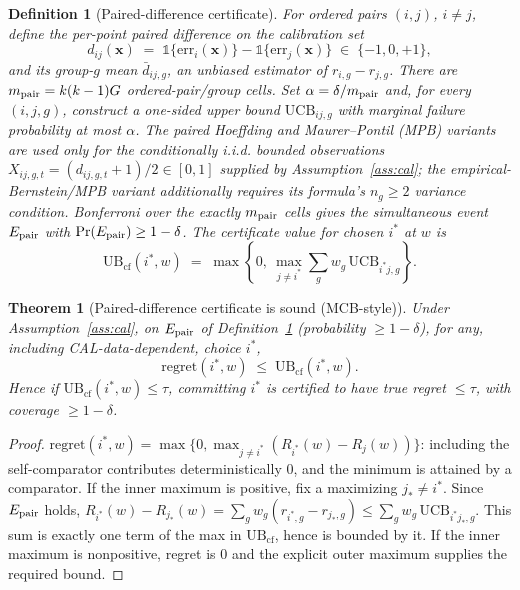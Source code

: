 \documentclass{article}
\newtheorem{theorem}{Theorem}
\newtheorem{definition}{Definition}
\begin{document}
\begin{definition}[Paired-difference certificate]
\label{def:paired}
For ordered pairs $(i,j)$, $i\ne j$, define the per-point paired difference on the
calibration set
\[
  d_{ij}(\mathbf{x}) \;=\; \mathbb{1}\{\text{err}_i(\mathbf{x})\}
        - \mathbb{1}\{\text{err}_j(\mathbf{x})\} \;\in\; \{-1,0,+1\},
\]
and its group-$g$ mean $\bar d_{ij,g}$, an unbiased estimator of $r_{i,g}-r_{j,g}$.
There are $m_{\rm pair}=k(k-1)G$ ordered-pair/group cells. Set
$\alpha=\delta/m_{\rm pair}$ and, for every $(i,j,g)$, construct a one-sided upper bound
$\mathrm{UCB}_{ij,g}$ with marginal failure probability at most $\alpha$. The paired
Hoeffding and Maurer--Pontil (MPB) variants are used only for the conditionally i.i.d. bounded
observations $X_{ij,g,t}=(d_{ij,g,t}+1)/2\in[0,1]$ supplied by
Assumption~\ref{ass:cal}; the empirical-Bernstein/MPB variant additionally requires its
formula's $n_g\ge2$ variance condition. Bonferroni over the exactly $m_{\rm pair}$ cells gives
the simultaneous event $E_{\rm pair}$ with $\Pr(E_{\rm pair})\ge1-\delta$. The certificate
value for chosen $i^*$ at $w$ is
\[
  \mathrm{UB}_{\mathrm{cf}}(i^*,w) \;=\;
  \max\!\left\{0,\ \max_{j\ne i^*}\sum_{g} w_g\, \mathrm{UCB}_{i^*j,g}\right\}.
\]
\end{definition}

\begin{theorem}[Paired-difference certificate is sound (MCB-style)]
\label{thm:m25}
Under Assumption~\ref{ass:cal}, on $E_{\rm pair}$ of Definition~\ref{def:paired}
(probability $\ge1-\delta$), for \emph{any}, including CAL-data-dependent, choice $i^*$,
\[
  \mathrm{regret}(i^*,w)\;\le\;\mathrm{UB}_{\mathrm{cf}}(i^*,w).
\]
Hence if $\mathrm{UB}_{\mathrm{cf}}(i^*,w)\le\tau$, committing $i^*$ is certified to have
true regret $\le\tau$, with coverage $\ge1-\delta$.
\end{theorem}
\begin{proof}
$\mathrm{regret}(i^*,w)=\max\{0,\max_{j\ne i^*}(R_{i^*}(w)-R_j(w))\}$: including the
self-comparator contributes deterministically $0$, and the minimum is attained by a comparator.
If the inner maximum is positive, fix a maximizing $j_*\ne i^*$. Since
$E_{\rm pair}$ holds, $R_{i^*}(w)-R_{j_*}(w)=\sum_g w_g(r_{i^*,g}-r_{j_*,g})
\le \sum_g w_g\,\mathrm{UCB}_{i^*j_*,g}$. This sum is exactly one term of the max in
$\mathrm{UB}_{\mathrm{cf}}$, hence is bounded by it. If the inner maximum is nonpositive,
regret is $0$ and the explicit outer maximum supplies the required bound.
\end{proof}
\end{document}
